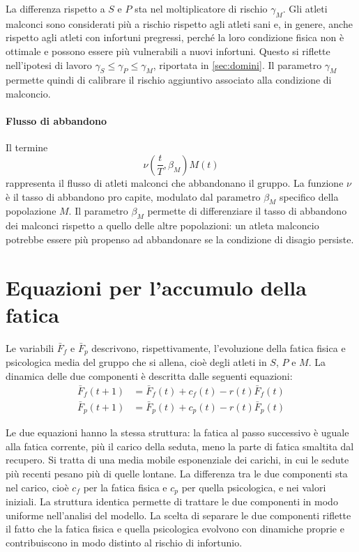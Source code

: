 La differenza rispetto a $S$ e $P$ sta nel moltiplicatore di rischio $\gamma_M$. Gli atleti malconci sono considerati più a rischio rispetto agli atleti sani e, in genere, anche rispetto agli atleti con infortuni pregressi, perché la loro condizione fisica non è ottimale e possono essere più vulnerabili a nuovi infortuni. Questo si riflette nell'ipotesi di lavoro $\gamma_S \leq \gamma_P \leq \gamma_M$, riportata in \autoref{sec:domini}. Il parametro $\gamma_M$ permette quindi di calibrare il rischio aggiuntivo associato alla condizione di malconcio.

\paragraph{Flusso di abbandono}
Il termine
\[
    \nu\left(\frac{t}{T}, \beta_M\right) M(t)
\]
rappresenta il flusso di atleti malconci che abbandonano il gruppo. La funzione $\nu$ è il tasso di abbandono pro capite, modulato dal parametro $\beta_M$ specifico della popolazione $M$. Il parametro $\beta_M$ permette di differenziare il tasso di abbandono dei malconci rispetto a quello delle altre popolazioni: un atleta malconcio potrebbe essere più propenso ad abbandonare se la condizione di disagio persiste.

\section{Equazioni per l'accumulo della fatica}

Le variabili $\bar{F}_f$ e $\bar{F}_p$ descrivono, rispettivamente, l'evoluzione della fatica fisica e psicologica media del gruppo che si allena, cioè degli atleti in $S$, $P$ e $M$. La dinamica delle due componenti è descritta dalle seguenti equazioni:
\begin{align*}
    \bar{F}_f(t+1) &= \bar{F}_f(t)
        + c_f(t)
        - r(t) \bar{F}_f(t) \\[5pt]
    \bar{F}_p(t+1) &= \bar{F}_p(t)
        + c_p(t)
        - r(t) \bar{F}_p(t)
\end{align*}

Le due equazioni hanno la stessa struttura: la fatica al passo successivo è uguale alla fatica corrente, più il carico della seduta, meno la parte di fatica smaltita dal recupero. Si tratta di una media mobile esponenziale dei carichi, in cui le sedute più recenti pesano più di quelle lontane. La differenza tra le due componenti sta nel carico, cioè $c_f$ per la fatica fisica e $c_p$ per quella psicologica, e nei valori iniziali. La struttura identica permette di trattare le due componenti in modo uniforme nell'analisi del modello. La scelta di separare le due componenti riflette il fatto che la fatica fisica e quella psicologica evolvono con dinamiche proprie e contribuiscono in modo distinto al rischio di infortunio.


